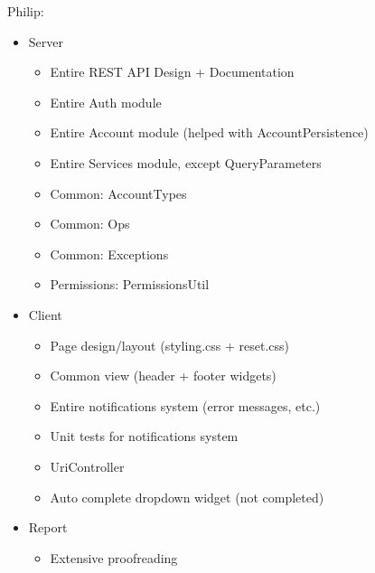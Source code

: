 Philip:
\begin{itemize}
	\item Server
	\begin{itemize}
		\item Entire REST API Design + Documentation
		\item Entire Auth module
		\item Entire Account module (helped with AccountPersistence)
		\item Entire Services module, except QueryParameters
		\item Common: AccountTypes
		\item Common: Ops
		\item Common: Exceptions
		\item Permissions: PermissionsUtil
	\end{itemize}
	\item Client
	\begin{itemize}
		\item Page design/layout (styling.css + reset.css)
		\item Common view (header + footer widgets)
		\item Entire notifications system (error messages, etc.)
		\item Unit tests for notifications system
		\item UriController
		\item Auto complete dropdown widget (not completed)
	\end{itemize}
	\item Report
	\begin{itemize}
		\item Extensive proofreading
	\end{itemize}
\end{itemize} 